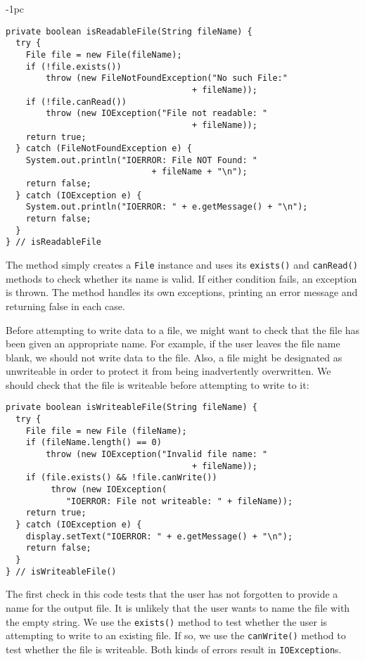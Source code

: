 \begin{jjjlistingleft}[27pc]{-1pc}
\begin{lstlisting}
private boolean isReadableFile(String fileName) {
  try {
    File file = new File(fileName);
    if (!file.exists())
        throw (new FileNotFoundException("No such File:" 
                                     + fileName));
    if (!file.canRead())
        throw (new IOException("File not readable: " 
                                     + fileName));
    return true;                                    
  } catch (FileNotFoundException e) {
    System.out.println("IOERROR: File NOT Found: " 
                             + fileName + "\n");
    return false;
  } catch (IOException e) {
    System.out.println("IOERROR: " + e.getMessage() + "\n");
    return false;
  }
} // isReadableFile
\end{lstlisting}
\end{jjjlistingleft}

\noindent The method simply creates a {\tt File} instance and
uses its {\tt exists()} and {\tt canRead()} methods to
check whether its name is valid.  If either condition
fails, an exception is thrown.  The method handles its
own exceptions, printing an error message and returning false
in each case.

Before attempting to write data to a file, we might want to check that
the file has been given an appropriate name.  For example, if the user
leaves the file name blank, we should not write data to the file.
Also, a file might be designated as unwriteable in order to protect it
from being inadvertently overwritten.  We should check that the file is
writeable before attempting to write to it:

\begin{jjjlisting}
\begin{lstlisting}
private boolean isWriteableFile(String fileName) {
  try {
    File file = new File (fileName);
    if (fileName.length() == 0)
        throw (new IOException("Invalid file name: " 
                                     + fileName));
    if (file.exists() && !file.canWrite())
         throw (new IOException(
            "IOERROR: File not writeable: " + fileName));
    return true;
  } catch (IOException e) {
    display.setText("IOERROR: " + e.getMessage() + "\n");
    return false;
  }
} // isWriteableFile()
\end{lstlisting}
\end{jjjlisting}

\noindent The first check in this code tests that the user has
not forgotten to provide a name for the output file.  It is unlikely
that the user wants to name the file with the empty string.   We use
the {\tt exists()} method to test whether the user is attempting to
write to an existing file.  If so, we use the {\tt canWrite()} method
to test whether the file is writeable.  Both kinds of errors result in
{\tt IOException}s.

